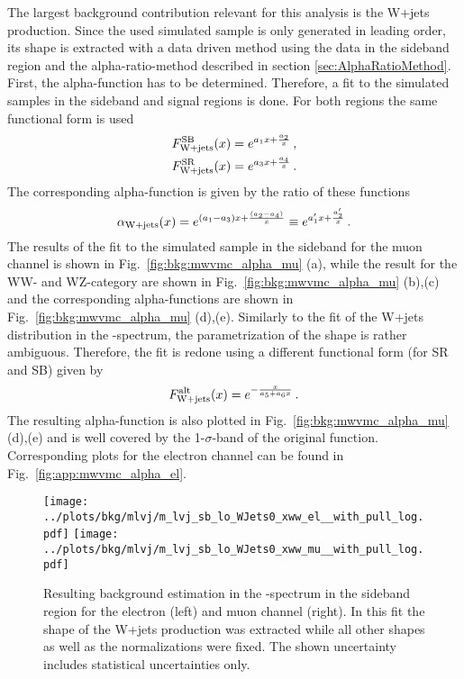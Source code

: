 The largest background contribution relevant for this analysis is the W+jets production. Since the used simulated sample is only generated in leading order, its shape is extracted with a data driven method using the data in the sideband region and the alpha-ratio-method described in section \ref{sec:AlphaRatioMethod}. First, the alpha-function has to be determined. Therefore, a fit to the simulated samples in the sideband and signal regions is done. For both regions the same functional form is used
\begin{align}
F_{\rm W+jets}^{\rm SB}(x)=e^{a_1x+\frac{a_2}{x}} \, , \\
F_{\rm W+jets}^{\rm SR}(x)=e^{a_3x+\frac{a_4}{x}} \, . \label{eq:bkg:wjetssig}
\end{align}
The corresponding alpha-function is given by the ratio of these functions
\begin{equation}
\alpha_{\rm W+jets}(x) = e^{(a_1-a_3)x+\frac{(a_2-a_4)}{x}} \equiv e^{a_1'x+\frac{a_2'}{x}} \, .
\end{equation}
The results of the fit to the simulated sample in the sideband for the muon channel is shown in Fig.~\ref{fig:bkg:mwvmc_alpha_mu} (a), while the result for the WW- and WZ-category are shown in Fig.~\ref{fig:bkg:mwvmc_alpha_mu} (b),(c) and the corresponding alpha-functions are shown in Fig.~\ref{fig:bkg:mwvmc_alpha_mu} (d),(e). Similarly to the fit of the W+jets distribution in the \Mpr -spectrum, the parametrization of the shape is rather ambiguous. Therefore, the fit is redone using a different functional form (for SR and SB) given by
\begin{equation}
F_{\rm W+jets}^{\rm alt}(x)=e^{-\frac{x}{a_5+a_6x}} \, .
\end{equation}
The resulting alpha-function is also plotted in Fig.~\ref{fig:bkg:mwvmc_alpha_mu} (d),(e) and is well covered by the 1-$\sigma$-band of the original function. Corresponding plots for the electron channel can be found in Fig.~\ref{fig:app:mwvmc_alpha_el}.\\
\begin{figure}
	\centering
	\texttt{[image: ../plots/bkg/mlvj/m\_lvj\_sb\_lo\_WJets0\_xww\_el\_\_with\_pull\_log.pdf]}
	\texttt{[image: ../plots/bkg/mlvj/m\_lvj\_sb\_lo\_WJets0\_xww\_mu\_\_with\_pull\_log.pdf]}
	\caption[Resulting background estimation in the \MWV -spectrum in the sideband region]{Resulting background estimation in the \MWV -spectrum in the sideband region for the electron (left) and muon channel (right). In this fit the shape of the W+jets production was extracted while all other shapes as well as the normalizations were fixed. The shown uncertainty includes statistical uncertainties only.}	
	\label{fig:bkg:data_sb}
\end{figure}
